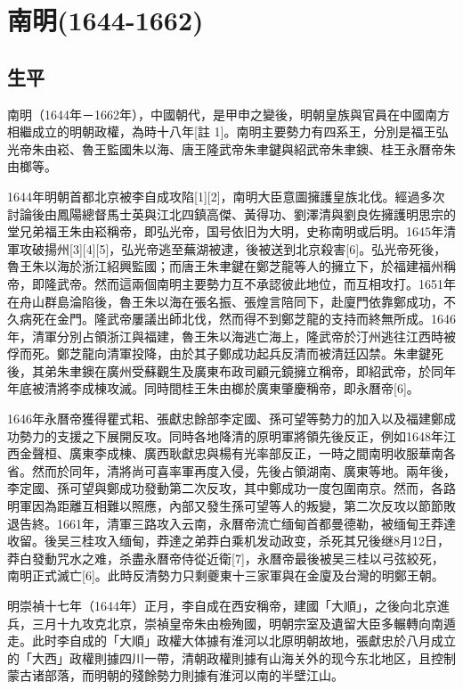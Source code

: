 
\section{南明\tiny(1644-1662)}

\subsection{生平}

南明（1644年－1662年），中國朝代，是甲申之變後，明朝皇族與官員在中國南方相繼成立的明朝政權，為時十八年[註 1]。南明主要勢力有四系王，分別是福王弘光帝朱由崧、魯王監國朱以海、唐王隆武帝朱聿鍵與紹武帝朱聿鐭、桂王永曆帝朱由榔等。

1644年明朝首都北京被李自成攻陷[1][2]，南明大臣意圖擁護皇族北伐。經過多次討論後由鳳陽總督馬士英與江北四鎮高傑、黃得功、劉澤清與劉良佐擁護明思宗的堂兄弟福王朱由崧稱帝，即弘光帝，国号依旧为大明，史称南明或后明。1645年清軍攻破揚州[3][4][5]，弘光帝逃至蕪湖被逮，後被送到北京殺害[6]。弘光帝死後，魯王朱以海於浙江紹興監國；而唐王朱聿鍵在鄭芝龍等人的擁立下，於福建福州稱帝，即隆武帝。然而這兩個南明主要勢力互不承認彼此地位，而互相攻打。1651年在舟山群島淪陷後，魯王朱以海在張名振、張煌言陪同下，赴廈門依靠鄭成功，不久病死在金門。隆武帝屢議出師北伐，然而得不到鄭芝龍的支持而終無所成。1646年，清軍分別占領浙江與福建，魯王朱以海逃亡海上，隆武帝於汀州逃往江西時被俘而死。鄭芝龍向清軍投降，由於其子鄭成功起兵反清而被清廷囚禁。朱聿鍵死後，其弟朱聿鐭在廣州受蘇觀生及廣東布政司顧元鏡擁立稱帝，即紹武帝，於同年年底被清將李成棟攻滅。同時間桂王朱由榔於廣東肇慶稱帝，即永曆帝[6]。

1646年永曆帝獲得瞿式耜、張獻忠餘部李定國、孫可望等勢力的加入以及福建鄭成功勢力的支援之下展開反攻。同時各地降清的原明軍將領先後反正，例如1648年江西金聲桓、廣東李成棟、廣西耿獻忠與楊有光率部反正，一時之間南明收服華南各省。然而於同年，清將尚可喜率軍再度入侵，先後占領湖南、廣東等地。兩年後，李定國、孫可望與鄭成功發動第二次反攻，其中鄭成功一度包圍南京。然而，各路明軍因為距離互相難以照應，內部又發生孫可望等人的叛變，第二次反攻以節節敗退告終。1661年，清軍三路攻入云南，永曆帝流亡缅甸首都曼德勒，被缅甸王莽達收留。後吴三桂攻入缅甸，莽達之弟莽白乘机发动政变，杀死其兄後继8月12日，莽白發動咒水之难，杀盡永曆帝侍從近衛[7]，永曆帝最後被吴三桂以弓弦絞死，南明正式滅亡[6]。此時反清勢力只剩夔東十三家軍與在金廈及台灣的明鄭王朝。

明崇禎十七年（1644年）正月，李自成在西安稱帝，建國「大順」，之後向北京進兵，三月十九攻克北京，崇禎皇帝朱由檢殉國，明朝宗室及遺留大臣多輾轉向南遁走。此时李自成的「大順」政權大体據有淮河以北原明朝故地，張獻忠於八月成立的「大西」政權則據四川一帶，清朝政權則據有山海关外的现今东北地区，且控制蒙古诸部落，而明朝的殘餘勢力則據有淮河以南的半壁江山。

